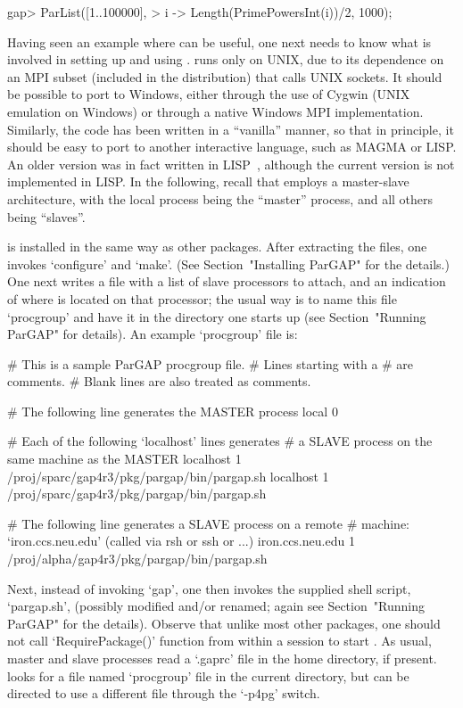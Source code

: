 \beginexample
gap> ParList([1..100000],
>            i -> Length(PrimePowersInt(i))/2, 1000);
\endexample


Having seen an example where {\ParGAP} can be useful, one next  needs  to
know what is involved in setting up and using {\ParGAP}.  {\ParGAP}  runs
only on UNIX, due to its dependence on an MPI  subset  (included  in  the
distribution) that calls UNIX sockets. It  should  be  possible  to  port
{\ParGAP} to Windows, either through the use of Cygwin (UNIX emulation on
Windows) or through a native Windows MPI implementation.  Similarly,  the
code has been written in a ``vanilla'' manner, so that in  principle,  it
should be easy to port to another interactive language, such as MAGMA  or
LISP. An older version was in fact written in LISP~\cite{Coo95}, although
the current version is not implemented in LISP. In the following,  recall
that {\ParGAP}  employs  a  master-slave  architecture,  with  the  local
process being the ``master'' process, and all others being ``slaves''.

{\ParGAP} is installed in the same way as other  {\GAP}  packages.  After
extracting the {\ParGAP} files, one invokes `configure' and `make'.  (See
Section~"Installing ParGAP" for the details.) One next writes a file with
a list of  slave  processors  to  attach,  and  an  indication  of  where
{\ParGAP} is located on that processor; the usual way  is  to  name  this
file `procgroup' and have it in the directory  one  starts  up  {\ParGAP}
(see Section~"Running ParGAP" for details). An example  `procgroup'  file
is:

\begintt
# This is a sample ParGAP procgroup file.
# Lines starting with a # are comments.
# Blank lines are also treated as comments.

# The following line generates the MASTER process
local 0

# Each of the following `localhost' lines generates 
# a SLAVE process on the same machine as the MASTER
localhost 1 /proj/sparc/gap4r3/pkg/pargap/bin/pargap.sh
localhost 1 /proj/sparc/gap4r3/pkg/pargap/bin/pargap.sh

# The following line generates a SLAVE process on a remote
# machine: `iron.ccs.neu.edu' (called via rsh or ssh or ...)
iron.ccs.neu.edu 1 /proj/alpha/gap4r3/pkg/pargap/bin/pargap.sh
\endtt

Next, instead of invoking `gap', one  then  invokes  the  supplied  shell
script,  `pargap.sh',  (possibly  modified  and/or  renamed;  again   see
Section~"Running ParGAP" for the details). Observe that unlike most other
{\GAP} packages, one should not  call  `RequirePackage()'  function  from
within a {\GAP} session to start {\ParGAP}. As usual,  master  and  slave
processes read a  `.gaprc'  file  in  the  home  directory,  if  present.
{\ParGAP} looks  for  a  file  named  `procgroup'  file  in  the  current
directory, but can be directed  to  use  a  different  file  through  the
`-p4pg' switch.

